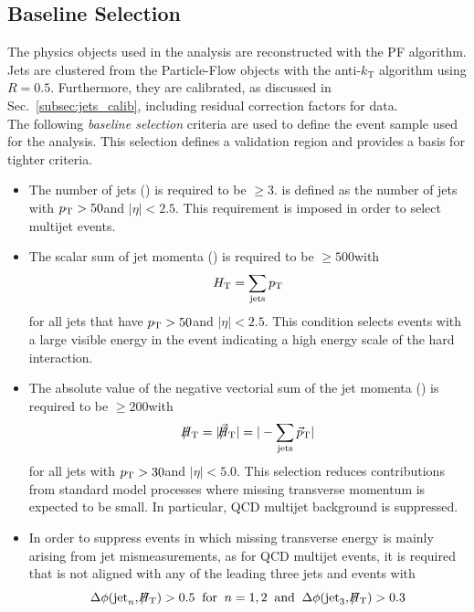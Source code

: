 \subsection{Baseline Selection}
\label{subsec:RA2_baseline}
The physics objects used in the analysis are reconstructed with the PF algorithm. Jets are clustered from the Particle-Flow objects with the anti-$k_\mathrm{T}$ algorithm using $R = 0.5$. Furthermore, they are calibrated, as discussed in Sec.~\ref{subsec:jets_calib}, including residual correction factors for data. \\
The following \textit{baseline selection} criteria are used to define the event sample used for the analysis. This selection defines a validation region and provides a basis for tighter criteria.
\begin{itemize}
 \item{The number of jets (\NJets) is required to be $\ge 3$. \NJets is defined as the number of jets with $p_{\text{T}} > 50$\gev and $|\eta| < 2.5$. This requirement is imposed in order to select multijet events.}
 \item{The scalar sum of jet momenta (\HT) is required to be $\ge 500$\gev with 
\begin{equation*}
H_{\text{T}} = \sum_{\mathrm{jets}} p_{\text{T}} 
\end{equation*}
for all jets that have $p_{\text{T}} > 50$\gev and $|\eta| < 2.5$. This condition selects events with a large visible energy in the event indicating a high energy scale of the hard interaction.}   
 \item{The absolute value of the negative vectorial sum of the jet momenta (\MHT) is required to be $\ge 200$\gev with
\begin{equation*}
\slash\mkern-12mu{H}_{\text{T}} = |\slash\mkern-12mu{\vec{H}}_{\text{T}}|= |- \sum_{\mathrm{jets}} \vec{p}_{\text{T}} |
\end{equation*}
for all jets with $p_{\text{T}} > 30$\gev and $|\eta| < 5.0$. This selection reduces contributions from standard model processes where missing transverse momentum is expected to be small. In particular, QCD multijet background is suppressed. } 
 \item{In order to suppress events in which missing transverse energy is mainly arising from jet mismeasurements, as for QCD multijet events, it is required that \MHT is not aligned with any of the leading three jets and events with
\begin{equation*}
\Delta \phi(\mathrm{jet}_n, \slash\mkern-12mu{H}_{\text{T}}) > 0.5 \;\; \mathrm{for} \;\; n = 1,2 \;\; \mathrm{and} \;\; \Delta \phi(\mathrm{jet}_3, \slash\mkern-12mu{H}_{\text{T}}) > 0.3
\end{equation*} 
}
\end{itemize}
